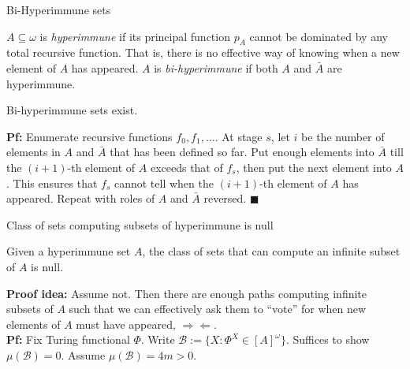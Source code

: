 \begin{frame}{Bi-Hyperimmune sets}
  \begin{define}
    $A\subseteq\omega$ is \textit{hyperimmune} if its principal function
    $p_A$ cannot be dominated by any total recursive function. That is,
    there is no effective way of knowing when a new element of $A$ has
    appeared. $A$ is \textit{bi-hyperimmune} if both $A$ and $\bar{A}$ are
    hyperimmune.
  \end{define}

  \begin{thm}
    Bi-hyperimmune sets exist.
  \end{thm}

  \textbf{Pf:} Enumerate recursive functions $f_0,f_1,\ldots$. At stage
  $s$, let $i$ be the number of elements in $A$ and $\bar{A}$ that has been
  defined so far. Put enough elements into $\bar{A}$ till the $(i+1)$-th
  element of $A$ exceeds that of $f_s$, then put the next element into $A$.
  This ensures that $f_s$ cannot tell when the $(i+1)$-th element of $A$
  has appeared. Repeat with roles of $A$ and $\bar{A}$ reversed.
  $\blacksquare$
\end{frame}

\begin{frame}{Class of sets computing subsets of hyperimmune is null}
  \begin{thm}
    \label{thm:bihyper-null}
    Given a hyperimmune set $A$, the class of sets that can compute an
    infinite subset of $A$ is null.
  \end{thm}

  \vspace{1em}
  \textbf{Proof idea:} Assume not. Then there are enough paths computing
  infinite subsets of $A$ such that we can effectively ask them to ``vote''
  for when new elements of $A$ must have appeared,
  $\Rightarrow\Leftarrow$.\\

  \vspace{1em}
  \textbf{Pf:} Fix Turing functional $\Phi$. Write $\mathcal{B} :=\{X:
  \Phi^X\in[A]^\omega\}$. Suffices to show $\mu(\mathcal{B})=0$. Assume
  $\mu(\mathcal{B})=4m>0$.
\end{frame}


